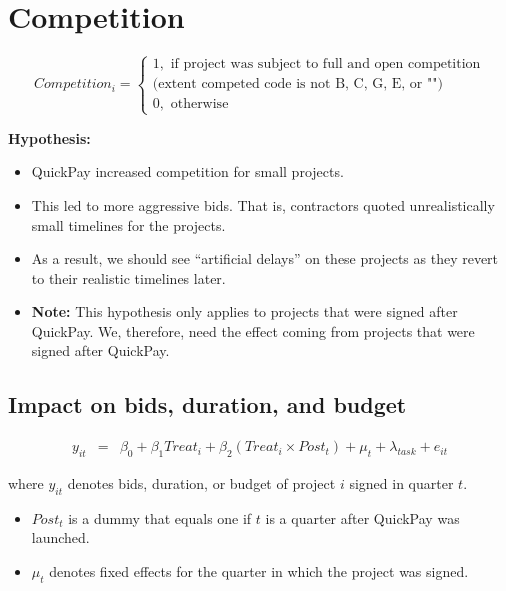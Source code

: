 \documentclass[]{article}
\providecommand{\tightlist}{%
  \setlength{\itemsep}{0pt}\setlength{\parskip}{0pt}}
\begin{document}
\hypertarget{competition}{%
\section{Competition}\label{competition}}

\[ Competition_i = \begin{cases} 1, \text{ if project was subject to full and open competition}\\ 
                       \text{(extent competed code is not B, C, G, E, or "")}\\
0, \text{ otherwise} \end{cases}\]

\textbf{Hypothesis:}

\begin{itemize}
\tightlist
\item
  QuickPay increased competition for small projects.
\item
  This led to more aggressive bids. That is, contractors quoted
  unrealistically small timelines for the projects.
\item
  As a result, we should see ``artificial delays'' on these projects as
  they revert to their realistic timelines later.
\item
  \textbf{Note:} This hypothesis only applies to projects that were
  signed after QuickPay. We, therefore, need the effect coming from
  projects that were signed after QuickPay.
\end{itemize}

\hypertarget{impact-on-bids-duration-and-budget}{%
\subsection{Impact on bids, duration, and
budget}\label{impact-on-bids-duration-and-budget}}

\[ \begin{aligned}
y_{it} &=& \beta_0 + \beta_1 Treat_i + \beta_2 (Treat_i \times Post_t) +\mu_t+ \lambda_{task}+ e_{it}
\end{aligned}\]

where \(y_{it}\) denotes bids, duration, or budget of project \(i\)
signed in quarter \(t\).

\begin{itemize}
\tightlist
\item
  \(Post_t\) is a dummy that equals one if \(t\) is a quarter after
  QuickPay was launched.
\item
  \(\mu_t\) denotes fixed effects for the quarter in which the project
  was signed.
\end{itemize}
\end{document}
